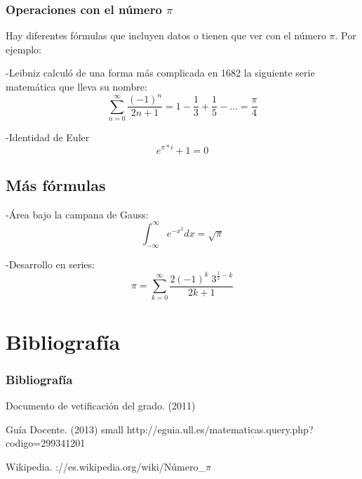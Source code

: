 \documentclass{beamer}        %
\begin{document}
\begin{frame}

\frametitle{Operaciones con el número $\pi$}
Hay diferentes fórmulas que incluyen datos o tienen que ver con el número $\pi$.
Por ejemplo: 

-Leibniz calculó de una forma más complicada en 1682 la siguiente serie matemática que lleva su nombre:
\begin{displaymath}
   \sum_{n=0}^{\infty} \frac{(-1)^n}{2n+1} = 1 - \frac{1}{3} + \frac{1}{5} - \dots = \frac{\pi}{4} 
\end{displaymath}

-Identidad de Euler
\begin{displaymath}
    e^{\pi*i} + 1 = 0 
\end{displaymath}
\subsection{Más fórmulas}
-Área bajo la campana de Gauss:
\begin{displaymath}
    \int_{-\infty}^{\infty} e^{-x^2} dx = \sqrt{\pi} 
\end{displaymath}

-Desarrollo en series:
\begin{displaymath}
   \pi = \sum_{k=0}^\infty \frac{2(-1)^k\; 3^{\frac{1}{2} - k}}{2k+1} 
\end{displaymath}
\end{frame}

\section{Bibliografía}%

\begin{frame}
  \frametitle{Bibliografía}
 
  \begin{thebibliography}{10}

  \beamertemplatebookbibitems
   Documento de vetificación del grado.
   (2011)

   \beamertemplatebookbibitems
    Guía Docente.
    (2013)
    {small http://eguia.ull.es/matematicas.query.php?codigo=299341201}

    \beamertemplatebookbibitems
     Wikipedia. {\smallhttp://es.wikipedia.org/wiki/Número\_$\pi$}

\end{thebibliography}
\end{frame}
\end{document}
